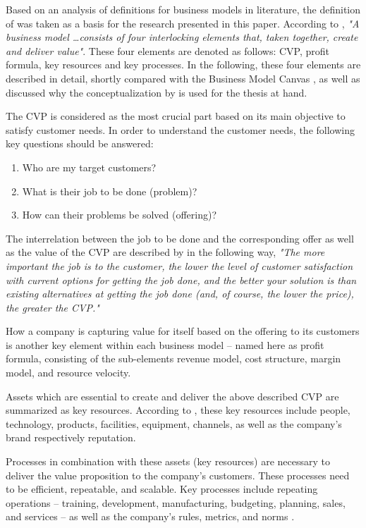 Based on an analysis of definitions for business models in literature, the definition of \citet{Johnson2008} was taken as a basis for the research presented in this paper. According to \citet[p. 52]{Johnson2008}, \textit{"A business model \ldots consists of four interlocking elements that, taken together, create and deliver value"}. These four elements are denoted as follows: \ac{CVP}, profit formula, key resources and key processes. In the following, these four elements are described in detail, shortly compared with the Business Model Canvas \citep{Osterwalder2010}, as well as discussed why the conceptualization by \citet{Johnson2008} is used for the thesis at hand.

The \ac{CVP} is considered as the most crucial part based on its main objective to satisfy customer needs. In order to understand the customer needs, the following key questions should be answered: 

\begin{enumerate}[parsep=0pt, topsep=0pt, itemsep=0pt]
	\item Who are my target customers?
	\item What is their job to be done (problem)?
	\item How can their problems be solved (offering)? 
\end{enumerate}

The interrelation between the job to be done and the corresponding offer as well as the value of the \ac{CVP} are described by  \citet[p. 52]{Johnson2008} in the following way, \textit{"The more important the job is to the customer, the lower the level of customer satisfaction with current options for getting the job done, and the better your solution is than existing alternatives at getting the job done (and, of course, the lower the price), the greater the CVP."}

How a company is capturing value for itself based on the offering to its customers is another key element within each business model -- named here as profit formula, consisting of the sub-elements revenue model, cost structure, margin model, and resource velocity.

Assets which are essential to create and deliver the above described \ac{CVP} are summarized as key resources. According to \citet[p. 53]{Johnson2008}, these key resources include people, technology, products, facilities, equipment, channels, as well as the company's brand respectively reputation.

Processes in combination with these assets (key resources) are necessary to deliver the value proposition to the company's customers. These processes need to be efficient, repeatable, and scalable. Key processes include repeating operations -- training, development, manufacturing, budgeting, planning, sales, and services -- as well as the company's rules, metrics, and norms \citep[p. 53]{Johnson2008}.

